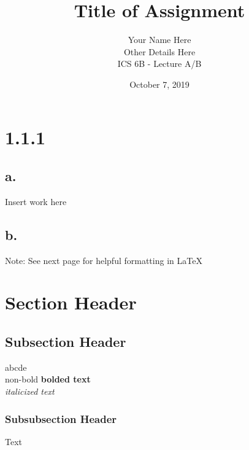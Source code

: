 \documentclass{article}
\begin{document}
\title{Title of Assignment}
\author{Your Name Here\\
        Other Details Here\\
        ICS 6B - Lecture A/B}
\date{October 7, 2019} %
\maketitle

\section*{1.1.1}                        %
\subsection*{a.}
Insert work here
\subsection*{b.}
Note: See next page for helpful formatting in LaTeX
\pagebreak                              %

\section{Section Header}                %
\subsection{Subsection Header}          %
abcde \\                                %
non-bold \textbf{bolded text}\\         %
\textit{italicized text}                %

\subsubsection{Subsubsection Header}    %
Text
\end{document}
